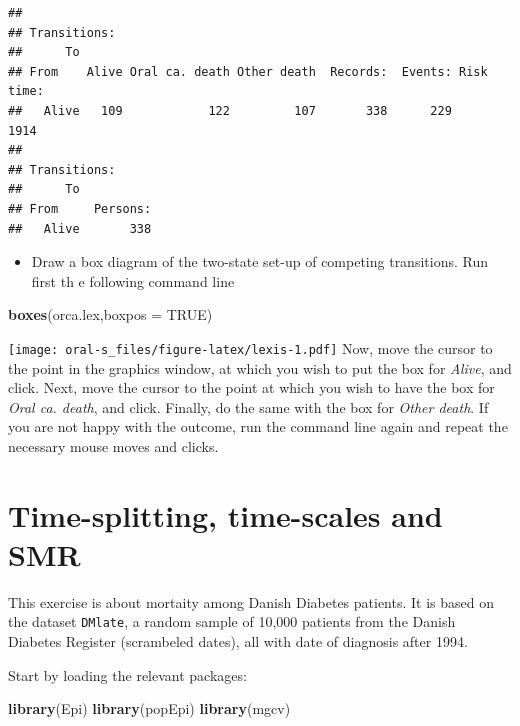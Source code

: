 \documentclass[
]{book}
\newenvironment{Shaded}{\begin{snugshade}}{\end{snugshade}}
\newcommand{\AttributeTok}[1]{\textcolor[rgb]{0.13,0.29,0.53}{#1}}
\newcommand{\ConstantTok}[1]{\textcolor[rgb]{0.56,0.35,0.01}{#1}}
\newcommand{\FunctionTok}[1]{\textcolor[rgb]{0.13,0.29,0.53}{\textbf{#1}}}
\newcommand{\NormalTok}[1]{#1}
\providecommand{\tightlist}{%
  \setlength{\itemsep}{0pt}\setlength{\parskip}{0pt}}
\begin{document}
\begin{verbatim}
##        
## Transitions:
##      To
## From    Alive Oral ca. death Other death  Records:  Events: Risk time:
##   Alive   109            122         107       338      229       1914
##        
## Transitions:
##      To
## From     Persons:
##   Alive       338
\end{verbatim}

\begin{itemize}
\tightlist
\item
  Draw a box diagram of the two-state set-up of competing transitions. Run first th e following command line
\end{itemize}

\begin{Shaded}
\begin{Highlighting}[]
\FunctionTok{boxes}\NormalTok{(orca.lex,}\AttributeTok{boxpos =} \ConstantTok{TRUE}\NormalTok{)}
\end{Highlighting}
\end{Shaded}

\texttt{[image: oral-s\_files/figure-latex/lexis-1.pdf]}
Now, move the cursor to the point in the graphics window, at which you wish to put the box for \emph{Alive}, and click. Next, move
the cursor to the point at which you wish to have the box for \emph{Oral ca. death}, and click. Finally, do the same with the box for \emph{Other death}.
If you are not happy with the outcome, run the command line again and repeat the necessary mouse moves and clicks.

\chapter{Time-splitting, time-scales and SMR}\label{time-splitting-time-scales-and-smr}

This exercise is about mortaity among Danish Diabetes patients. It is
based on the dataset \texttt{DMlate}, a random sample of 10,000
patients from the Danish Diabetes Register (scrambeled dates), all
with date of diagnosis after 1994.

Start by loading the relevant packages:

\begin{Shaded}
\begin{Highlighting}[]
\FunctionTok{library}\NormalTok{(Epi)}
\FunctionTok{library}\NormalTok{(popEpi)}
\FunctionTok{library}\NormalTok{(mgcv)}
\end{Highlighting}
\end{Shaded}
\end{document}
